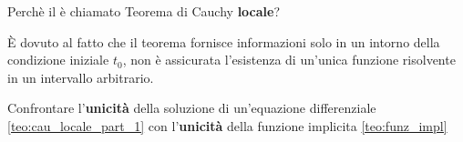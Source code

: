 \begin{exercise}
	Perchè il  è chiamato Teorema di Cauchy \textbf{locale}?
	\begin{solution}
		È dovuto al fatto che il teorema fornisce informazioni solo in un intorno della condizione iniziale $t_0$, non è assicurata l'esistenza di un'unica funzione risolvente in un intervallo arbitrario.
	\end{solution}
\end{exercise}

\begin{exercise}
	Confrontare l'\textbf{unicità} della soluzione di un'equazione differenziale \ref{teo:cau_locale_part_1} con l'\textbf{unicità} della funzione implicita \ref{teo:funz_impl}
\end{exercise}

